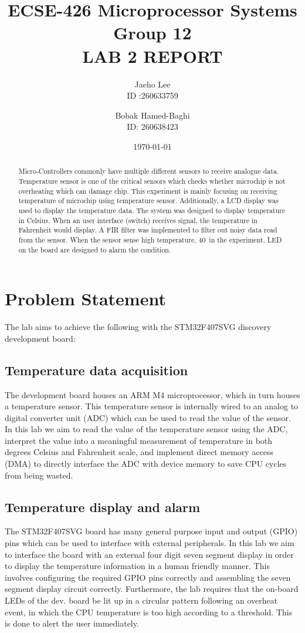 \documentclass{article}
\title{{ECSE-426 Microprocessor Systems} \\[1in] {\bfseries {\small Group 12} \\ LAB 2 REPORT \\[5cm] }}
\author{Jaeho Lee \\ ID :260633759 \and Bobak Hamed-Baghi \\ ID: 260638423 \\}
\date{\today}
\begin{document}
\maketitle %
\vfill

 \begin{abstract}
Micro-Controllers commonly have multiple different sensors to receive analogue data. Temperature sensor is one of the critical sensors which checks whether microchip is not overheating which can damage chip. This experiment is mainly focusing on receiving temperature of microchip using temperature sensor. Additionally, a LCD display was used to display the temperature data. The system was designed to display temperature in Celsius.  When an user interface (switch) receives signal, the temperature in Fahrenheit would display. A FIR filter was implemented to filter out noisy data read from the sensor. When the sensor sense high temperature, 40\, \celsius in the experiment, LED on the board are designed to alarm the condition.
 \end{abstract}
\newpage

\section{Problem Statement}
The lab aims to achieve the following with the STM32F407SVG discovery development board:

\subsection{Temperature data acquisition}
The development board houses an ARM M4 microprocessor, which in turn houses a temperature sensor. This temperature sensor is internally wired to an analog to digital converter unit (ADC) which can be used to read the value of the sensor. In this lab we aim to read the value of the temperature sensor using the ADC, interpret the value into a meaningful measurement of temperature in both degrees Celsius and Fahrenheit scale, and implement direct memory access (DMA) to directly interface the ADC with device memory to save CPU cycles from being wasted. 

\subsection{Temperature display and alarm}
The STM32F407SVG board has many general purpose input and output (GPIO) pins which can be used to interface with external peripherals. In this lab we aim to interface the board with an external four digit seven segment display in order to display the temperature information in a human friendly manner. This involves configuring the required GPIO pins correctly and assembling the seven segment display circuit correctly. Furthermore, the lab requires that the on-board LEDs of the dev. board be lit up in a circular pattern following an overheat event, in which the CPU temperature is too high according to a threshold. This is done to alert the user immediately.
\end{document}
